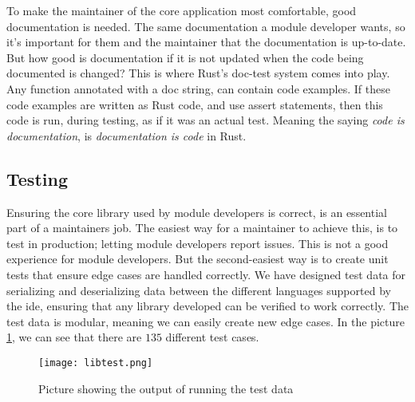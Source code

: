 To make the maintainer of the core application most comfortable, good
documentation is needed. The same documentation a module developer wants, so
it's important for them and the maintainer that the documentation is up-to-date.
But how good is documentation if it is not updated when the code being
documented is changed? This is where Rust's doc-test system comes into play. Any
function annotated with a doc string, can contain code examples. If these code
examples are written as Rust code, and use assert statements, then this code is
run, during testing, as if it was an actual test. Meaning the saying
\textit{code is documentation}, is \textit{documentation is code} in Rust.

\subsection{Testing}

Ensuring the core library used by module developers is correct, is an essential
part of a maintainers job. The easiest way for a maintainer to achieve this, is
to test in production; letting module developers report issues. This is not a
good experience for module developers. But the second-easiest way is to create
unit tests that ensure edge cases are handled correctly. We have designed test
data for serializing and deserializing data between the different languages
supported by the \gls{ide}, ensuring that any library developed can be
verified to work correctly. The test data is modular, meaning we can easily
create new edge cases. In the picture \ref{pic:libTest}, we can see that there
are $135$ different test cases.

\begin{figure}
  \centering
  \texttt{[image: libtest.png]}
  \caption{Picture showing the output of running the test data}
  \label{pic:libTest}
\end{figure}

